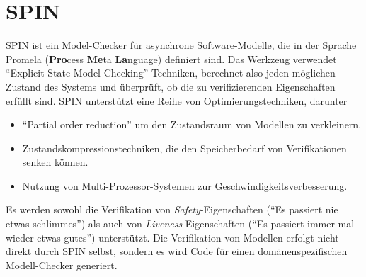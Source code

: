 \section{SPIN}
SPIN ist ein Model-Checker für asynchrone Software-Modelle, die in der Sprache Promela ({\bf Pro}cess {\bf Me}ta {\bf La}nguage) definiert sind\cite{spinbook}.
Das Werkzeug verwendet "`Explicit-State Model Checking"'-Techniken, berechnet also jeden möglichen Zustand des Systems und überprüft, ob die zu verifizierenden Eigenschaften erfüllt sind.
SPIN unterstützt eine Reihe von Optimierungstechniken, darunter
\begin{itemize}
\item "`Partial order reduction"' um den Zustandsraum von Modellen zu verkleinern.
\item Zustandskompressionstechniken, die den Speicherbedarf von Verifikationen senken können.
\item Nutzung von Multi-Prozessor-Systemen zur Geschwindigkeitsverbesserung.
\end{itemize}
Es werden sowohl die Verifikation von \emph{Safety}-Eigenschaften ("`Es passiert nie etwas schlimmes"') als auch von \emph{Liveness}-Eigenschaften ("`Es passiert immer mal wieder etwas gutes"') unterstützt.
Die Verifikation von Modellen erfolgt nicht direkt durch SPIN selbst, sondern es wird Code für einen domänenspezifischen Modell-Checker generiert.